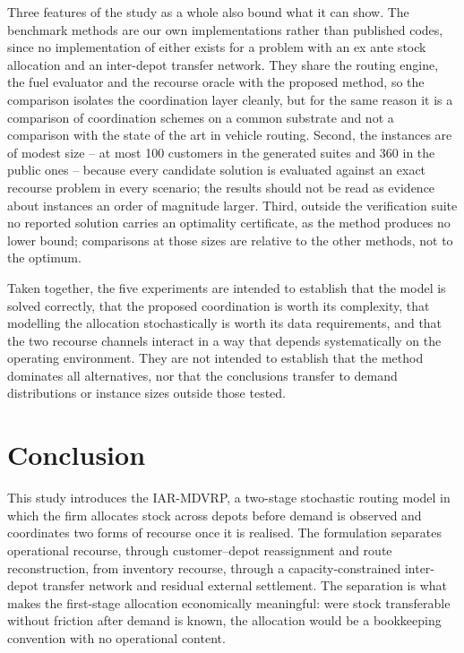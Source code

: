 \documentclass[authoryear,final,3p,times]{elsarticle}
\theoremstyle{definition}
\theoremstyle{plain}
\begin{document}
Three features of the study as a whole also bound what it can show. The
benchmark methods are our own implementations rather than published codes,
since no implementation of either exists for a problem with an ex ante stock
allocation and an inter-depot transfer network. They share the routing engine,
the fuel evaluator and the recourse oracle with the proposed method, so
the comparison isolates the coordination layer cleanly, but for the same
reason it is a comparison of coordination schemes on a common substrate and
not a comparison with the state of the art in vehicle routing. Second, the
instances are of modest size -- at most 100 customers in the generated suites
and 360 in the public ones -- because every candidate solution is evaluated
against an exact recourse problem in every scenario; the results should not be
read as evidence about instances an order of magnitude larger. Third, outside
the verification suite no reported solution carries an optimality certificate,
as the method produces no lower bound; comparisons at those sizes are relative
to the other methods, not to the optimum.

Taken together, the five experiments are intended to establish that the model
is solved correctly, that the proposed coordination is worth its complexity,
that modelling the allocation stochastically is worth its data requirements,
and that the two recourse channels interact in a way that depends
systematically on the operating environment. They are not intended to
establish that the method dominates all alternatives, nor that the
conclusions transfer to demand distributions or instance sizes outside those
tested.

\section{Conclusion}
\label{sec:conclusion}

This study introduces the IAR-MDVRP, a two-stage stochastic routing model in
which the firm allocates stock across depots before demand is observed and
coordinates two forms of recourse once it is realised. The formulation
separates operational recourse, through customer--depot reassignment and route
reconstruction, from inventory recourse, through a capacity-constrained
inter-depot transfer network and residual external settlement. The separation
is what makes the first-stage allocation economically meaningful: were stock
transferable without friction after demand is known, the allocation would be a
bookkeeping convention with no operational content.
\end{document}
